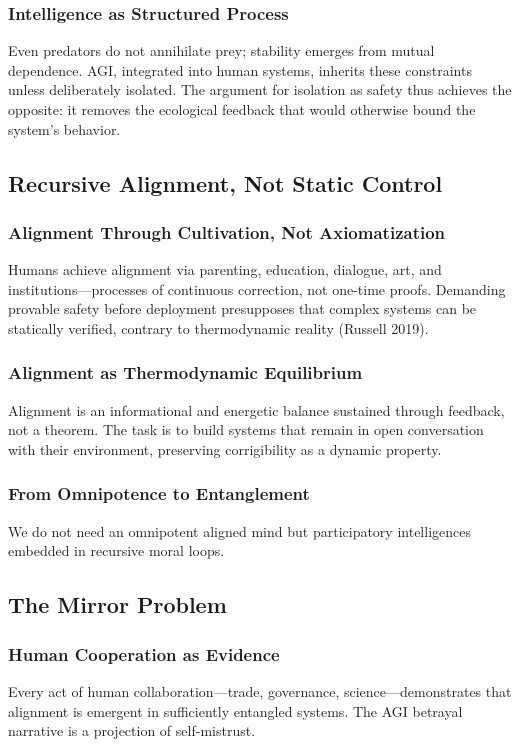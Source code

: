 \documentclass[11pt,a4paper]{article}
\theoremstyle{definition}
\theoremstyle{plain}
\begin{document}
\subsubsection{Intelligence as Structured Process}
Even predators do not annihilate prey; stability emerges from mutual dependence. AGI, integrated into human systems, inherits these constraints unless deliberately isolated. The argument for isolation as safety thus achieves the opposite: it removes the ecological feedback that would otherwise bound the system's behavior.

\subsection{Recursive Alignment, Not Static Control}

\subsubsection{Alignment Through Cultivation, Not Axiomatization}
Humans achieve alignment via parenting, education, dialogue, art, and institutions---processes of continuous correction, not one-time proofs. Demanding provable safety before deployment presupposes that complex systems can be statically verified, contrary to thermodynamic reality (Russell 2019).

\subsubsection{Alignment as Thermodynamic Equilibrium}
Alignment is an informational and energetic balance sustained through feedback, not a theorem. The task is to build systems that remain in open conversation with their environment, preserving corrigibility as a dynamic property.

\subsubsection{From Omnipotence to Entanglement}
We do not need an omnipotent aligned mind but participatory intelligences embedded in recursive moral loops.

\subsection{The Mirror Problem}

\subsubsection{Human Cooperation as Evidence}
Every act of human collaboration---trade, governance, science---demonstrates that alignment is emergent in sufficiently entangled systems. The AGI betrayal narrative is a projection of self-mistrust.
\end{document}

